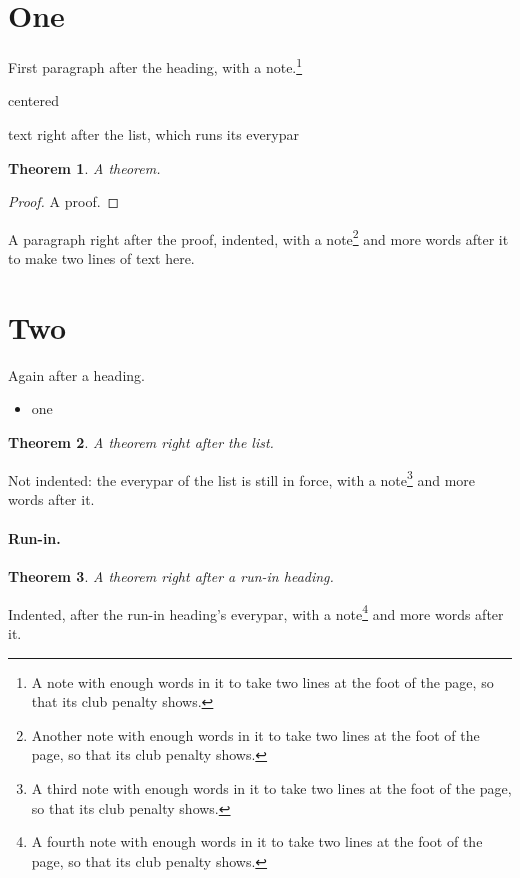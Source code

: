 \documentclass{article}
\newtheorem{theorem}{Theorem}
\begin{document}
\section{One}
First paragraph after the heading, with a note.\footnote{A note with enough words in it to take two lines at the foot of the page, so that its club penalty shows.}
\begin{center}
centered
\end{center}
text right after the list, which runs its everypar
\begin{theorem} A theorem.
\end{theorem}
\begin{proof} A proof.
\end{proof}
A paragraph right after the proof, indented, with a note\footnote{Another note with enough words in it to take two lines at the foot of the page, so that its club penalty shows.} and more words after it to make two lines of text here.

\section{Two}
Again after a heading.
\begin{itemize}
\item one
\end{itemize}
\begin{theorem} A theorem right after the list.
\end{theorem}
Not indented: the everypar of the list is still in force, with a note\footnote{A third note with enough words in it to take two lines at the foot of the page, so that its club penalty shows.} and more words after it.

\paragraph{Run-in.}
\begin{theorem} A theorem right after a run-in heading.
\end{theorem}
Indented, after the run-in heading's everypar, with a note\footnote{A fourth note with enough words in it to take two lines at the foot of the page, so that its club penalty shows.} and more words after it.
\end{document}
